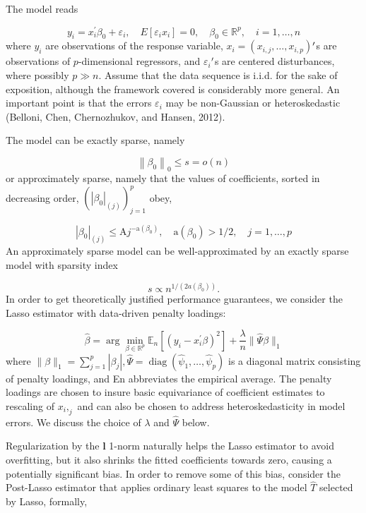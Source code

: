 \documentclass[12pt,a4paper]{article}
\begin{document}
The model reads

\[
y_i=x_i^{\prime} \beta_0+\varepsilon_i, \quad E\left[\varepsilon_i x_i\right]=0, \quad \beta_0 \in \mathbb{R}^p, \quad i=1, \ldots, n
\]
where $y_i$ are observations of the response variable, $x_i = (x_{i,j},\dots, x_{i,p})$\ensuremath{\rq}s are observations of $p$-dimensional regressors, and $\varepsilon_i$\ensuremath{\rq}s are centered disturbances, where possibly $p \gg n.$ Assume that the data sequence is i.i.d. for the sake of exposition, although the framework covered is considerably more general. An important point is that the errors $\varepsilon_i$ may be non-Gaussian or heteroskedastic (Belloni, Chen, Chernozhukov, and Hansen, 2012).

The model can be exactly sparse, namely

\[
\left\|\beta_0\right\|_0 \leq s=o(n)
\]
or approximately sparse, namely that the values of coefficients, sorted in decreasing order, $(|\beta_0|_{(j)})_{j=1}^p$ obey,

\[
\left|\beta_0\right|_{(j)} \leq \mathrm{A} j^{-\mathrm{a}\left(\beta_0\right)}, \quad \mathrm{a}\left(\beta_0\right)>1 / 2, \quad j=1, \ldots, p
\]
An approximately sparse model can be well-approximated by an exactly sparse model with sparsity index

\[
s \propto n^{1 /\left(2 a\left(\beta_0\right)\right)}.
\]
In order to get theoretically justified performance guarantees, we consider the Lasso estimator with data-driven penalty loadings:

\[
\hat{\beta}=\arg \min _{\beta \in \mathbb{R}^p} \mathbb{E}_n\left[\left(y_i-x_i^{\prime} \beta\right)^2\right]+\frac{\lambda}{n}\|\hat{\Psi} \beta\|_1
\]
where $\|\beta\|_1=\sum_{j=1}^p\left|\beta_j\right|,\hat{\Psi}=\operatorname{diag}\left(\hat{\psi}_1, \ldots, \hat{\psi}_p\right)$ is a diagonal matrix consisting of penalty loadings, and En abbreviates the empirical average. The penalty loadings are chosen to insure basic equivariance of coefficient estimates to rescaling of $x_i,_j$ and can also be chosen to address heteroskedasticity in model errors. We discuss the choice of $\lambda$ and $\hat{\Psi}$ below.

Regularization by the $\mathbf{l}$ 1-norm naturally helps the Lasso estimator to avoid overfitting, but it also shrinks the fitted coefficients towards zero, causing a potentially significant bias. In order to remove some of this bias, consider the Post-Lasso estimator that applies ordinary least squares to the model $\hat{T}$ selected by Lasso, formally,
\end{document}
